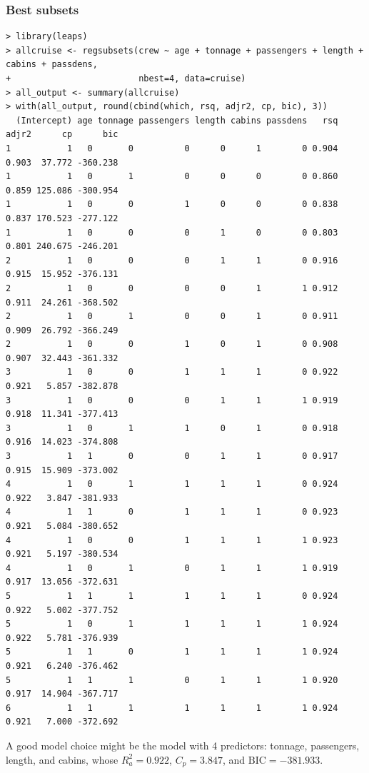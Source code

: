 \documentclass{beamer}
\begin{document}
\begin{frame}[fragile]
\frametitle{Best subsets}
\begin{tiny}
\begin{verbatim}
> library(leaps)
> allcruise <- regsubsets(crew ~ age + tonnage + passengers + length + cabins + passdens, 
+                         nbest=4, data=cruise)
> all_output <- summary(allcruise)
> with(all_output, round(cbind(which, rsq, adjr2, cp, bic), 3))
  (Intercept) age tonnage passengers length cabins passdens   rsq adjr2      cp      bic
1           1   0       0          0      0      1        0 0.904 0.903  37.772 -360.238
1           1   0       1          0      0      0        0 0.860 0.859 125.086 -300.954
1           1   0       0          1      0      0        0 0.838 0.837 170.523 -277.122
1           1   0       0          0      1      0        0 0.803 0.801 240.675 -246.201
2           1   0       0          0      1      1        0 0.916 0.915  15.952 -376.131
2           1   0       0          0      0      1        1 0.912 0.911  24.261 -368.502
2           1   0       1          0      0      1        0 0.911 0.909  26.792 -366.249
2           1   0       0          1      0      1        0 0.908 0.907  32.443 -361.332
3           1   0       0          1      1      1        0 0.922 0.921   5.857 -382.878
3           1   0       0          0      1      1        1 0.919 0.918  11.341 -377.413
3           1   0       1          1      0      1        0 0.918 0.916  14.023 -374.808
3           1   1       0          0      1      1        0 0.917 0.915  15.909 -373.002
4           1   0       1          1      1      1        0 0.924 0.922   3.847 -381.933
4           1   1       0          1      1      1        0 0.923 0.921   5.084 -380.652
4           1   0       0          1      1      1        1 0.923 0.921   5.197 -380.534
4           1   0       1          0      1      1        1 0.919 0.917  13.056 -372.631
5           1   1       1          1      1      1        0 0.924 0.922   5.002 -377.752
5           1   0       1          1      1      1        1 0.924 0.922   5.781 -376.939
5           1   1       0          1      1      1        1 0.924 0.921   6.240 -376.462
5           1   1       1          0      1      1        1 0.920 0.917  14.904 -367.717
6           1   1       1          1      1      1        1 0.924 0.921   7.000 -372.692
\end{verbatim}
\end{tiny}
\pause A good model choice might be the model with 4 predictors: tonnage, passengers, length, and cabins, whose $R_a^2 = 0.922$, $C_p = 3.847$, and
$\text{BIC}= −381.933$. %
\end{frame}
\end{document}
